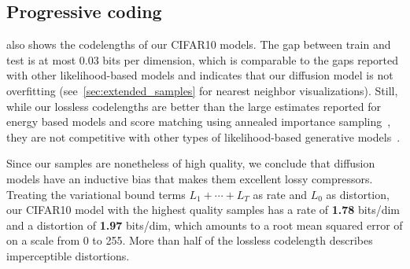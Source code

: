 \documentclass{article}
\newcommand{\bepsilon}{{\boldsymbol{\epsilon}}}
\newcommand{\bmu}{{\boldsymbol{\mu}}}
\newcommand{\bSigma}{{\boldsymbol{\Sigma}}}
\begin{document}


\subsection{Progressive coding}
\label{sec:coding}

 also shows the codelengths of our CIFAR10 models. The gap between train and test is at most 0.03 bits per dimension, which is comparable to the gaps reported with other likelihood-based models and indicates that our diffusion model is not overfitting (see~\cref{sec:extended_samples} for nearest neighbor visualizations).
Still, while our lossless codelengths are better than the large estimates reported for energy based models and score matching using annealed importance sampling~\citep{du2019implicit}, they are not competitive with other types of likelihood-based generative models~\citep{child2019generating}.

Since our samples are nonetheless of high quality, we conclude that diffusion models have an inductive bias that makes them excellent lossy compressors. Treating the variational bound terms $L_1 + \cdots + L_T$ as rate and $L_0$ as distortion, our CIFAR10 model with the highest quality samples has a rate of \textbf{1.78} bits/dim and a distortion of \textbf{1.97} bits/dim, which amounts to a root mean squared error of  on a scale from 0 to 255. More than half of the lossless codelength describes imperceptible distortions.
\end{document}
